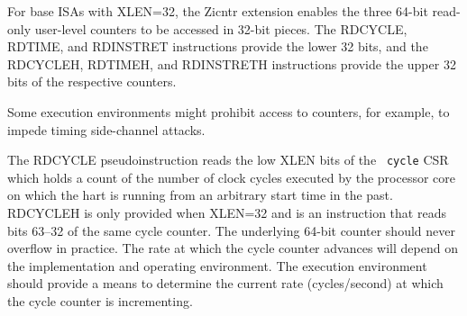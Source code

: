 For base ISAs with XLEN=32, the Zicntr extension enables the three
64-bit read-only user-level counters to be accessed in 32-bit pieces.
The RDCYCLE, RDTIME, and RDINSTRET instructions provide the lower 32
bits, and the RDCYCLEH, RDTIMEH, and RDINSTRETH instructions provide
the upper 32 bits of the respective counters.

\begin{commentary}
Some execution environments might prohibit access to counters, for
example, to impede timing side-channel attacks.
\end{commentary}

The RDCYCLE pseudoinstruction reads the low XLEN bits of the {\tt
  cycle} CSR which holds a count of the number of clock cycles
executed by the processor core on which the hart is running from an
arbitrary start time in the past.  RDCYCLEH is only provided when
XLEN=32 and is an instruction that reads bits 63--32 of the same cycle
counter.  The underlying 64-bit counter should never overflow in
practice.  The rate at which the cycle counter advances will depend on
the implementation and operating environment.  The execution
environment should provide a means to determine the current rate
(cycles/second) at which the cycle counter is incrementing.

